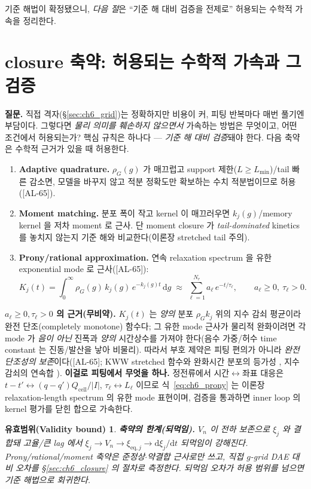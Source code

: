 \documentclass[11pt,a4paper]{article}
\newtheorem*{boundbox}{유효범위(Validity bound)}
\newcommand{\dd}{\mathrm{d}}
\newcommand{\eq}{\mathrm{eq}}
\newcommand{\cell}{\mathrm{cell}}
\newcommand{\AL}[1]{\textsf{[AL-#1]}}
\begin{document}
기준 해법이 확정됐으니, \emph{다음 절}은 ``기준 해 대비 검증을 전제로'' 허용되는 수학적 가속을 정리한다.

\section{closure 축약: 허용되는 수학적 가속과 그 검증}\label{sec:ch6_reduction}
\textbf{질문.} 직접 격자(\S\ref{sec:ch6_grid})는 정확하지만 비용이 커, 피팅 반복마다 매번 풀기엔 부담이다. 그렇다면
\emph{물리 의미를 훼손하지 않으면서} 가속하는 방법은 무엇이고, 어떤 조건에서 허용되는가? 핵심 규칙은 하나다 —
\emph{기준 해 대비 검증}돼야 한다. 다음 축약은 수학적 근거가 있을 때 허용한다.
\begin{enumerate}[label=\textbf{(\alph*)},leftmargin=2.4em]
\item \textbf{Adaptive quadrature.} $\rho_G(g)$ 가 매끄럽고 support 제한($L\ge L_{\min}$)/tail 빠른 감소면, 모델을
  바꾸지 않고 적분 정확도만 확보하는 수치 적분법이므로 허용(\AL{65}).
\item \textbf{Moment matching.} 분포 폭이 작고 kernel 이 매끄러우면 $k_j(g)$/memory kernel 을 저차 moment 로 근사.
  단 moment closure 가 \emph{tail-dominated} kinetics 를 놓치지 않는지 기준 해와 비교한다(이론장 stretched tail 주의).
\item \textbf{Prony/rational approximation.} 연속 relaxation spectrum 을 유한 exponential mode 로 근사(\AL{65}):
\begin{equation}
K_j(t)=\int_0^\infty\rho_G(g)\,k_j(g)\,e^{-k_j(g)t}\,\dd g\;\approx\;\sum_{\ell=1}^{N_r}a_\ell\,e^{-t/\tau_\ell},
\qquad a_\ell\ge0,\ \tau_\ell>0.
\label{eq:ch6_prony}
\end{equation}
\end{enumerate}
\textbf{$a_\ell\ge0,\tau_\ell>0$ 의 근거(무비약).} $K_j(t)$ 는 \emph{양의} 분포 $\rho_G k_j$ 위의 지수 감쇠 평균이라
완전 단조(completely monotone) 함수다; 그 유한 mode 근사가 물리적 완화이려면 각 mode 가 \emph{음이 아닌} 진폭과
\emph{양의} 시간상수를 가져야 한다(음수 가중/허수 time constant 는 진동/발산을 낳아 비물리). 따라서 부호 제약은
피팅 편의가 아니라 \emph{완전 단조성의 보존}이다(\AL{65}; KWW stretched 함수와 완화시간 분포의 등가성
\cite{lindsey1980}, 지수 감쇠의 연속합 \cite{johnston2006}).
\textbf{이걸로 피팅에서 무엇을 하나.} 정전류에서 시간$\leftrightarrow$좌표 대응은 $t-t'\leftrightarrow(q-q')Q_\cell/|I|$,
$\tau_\ell\leftrightarrow L_\ell$ 이므로 식~\eqref{eq:ch6_prony} 는 이론장 relaxation-length spectrum 의 유한 mode
표현이며, 검증을 통과하면 inner loop 의 kernel 평가를 닫힌 합으로 가속한다.
\begin{boundbox}
\textbf{축약의 한계(되먹임).} $V_n$ 이 전하 보존으로 $\xi_j$ 와 결합돼 고율/큰 lag 에서 $\xi_j\to V_n\to\xi_{\eq,j}
\to\dd\xi_j/\dd t$ 되먹임이 강해진다. Prony/rational/moment 축약은 \emph{준정상$\cdot$약결합} 근사로만 쓰고, 직접
$g$-grid DAE 대비 오차를 \S\ref{sec:ch6_closure} 의 절차로 측정한다. 되먹임 오차가 허용 범위를 넘으면 기준
해법으로 회귀한다.
\end{boundbox}
\end{document}
